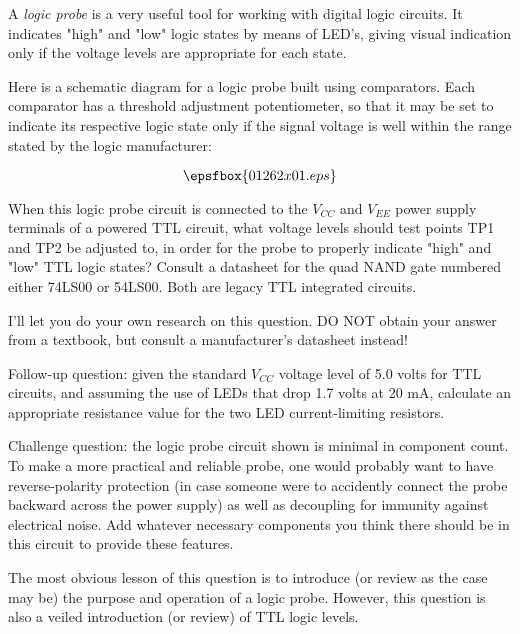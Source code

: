 

A {\it logic probe} is a very useful tool for working with digital logic circuits.  It indicates "high" and "low" logic states by means of LED's, giving visual indication only if the voltage levels are appropriate for each state.

Here is a schematic diagram for a logic probe built using comparators.  Each comparator has a threshold adjustment potentiometer, so that it may be set to indicate its respective logic state only if the signal voltage is well within the range stated by the logic manufacturer:

$$\epsfbox{01262x01.eps}$$

When this logic probe circuit is connected to the $V_{CC}$ and $V_{EE}$ power supply terminals of a powered TTL circuit, what voltage levels should test points TP1 and TP2 be adjusted to, in order for the probe to properly indicate "high" and "low" TTL logic states?  Consult a datasheet for the quad NAND gate numbered either 74LS00 or 54LS00.  Both are legacy TTL integrated circuits.







I'll let you do your own research on this question.  DO NOT obtain your answer from a textbook, but consult a manufacturer's datasheet instead!

\vskip 10pt

Follow-up question: given the standard $V_{CC}$ voltage level of 5.0 volts for TTL circuits, and assuming the use of LEDs that drop 1.7 volts at 20 mA, calculate an appropriate resistance value for the two LED current-limiting resistors.

\vskip 10pt

Challenge question: the logic probe circuit shown is minimal in component count.  To make a more practical and reliable probe, one would probably want to have reverse-polarity protection (in case someone were to accidently connect the probe backward across the power supply) as well as decoupling for immunity against electrical noise.  Add whatever necessary components you think there should be in this circuit to provide these features.







The most obvious lesson of this question is to introduce (or review as the case may be) the purpose and operation of a logic probe.  However, this question is also a veiled introduction (or review) of TTL logic levels.




